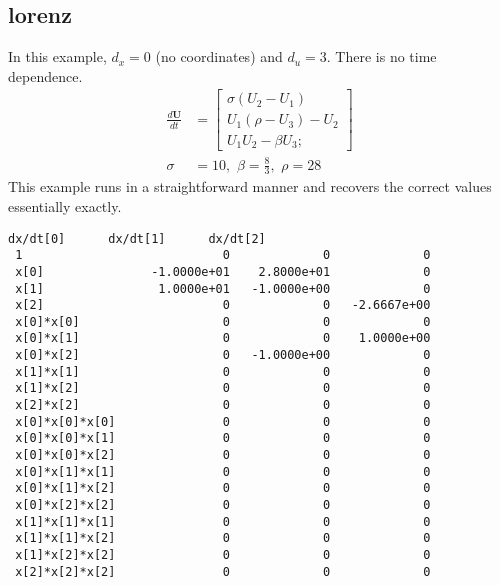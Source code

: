 \documentclass{article}
\let\vec\mathbf
\begin{document}
\subsection{lorenz}
In this example, $d_x = 0$ (no coordinates) and $d_u = 3$. There is no time dependence.
\begin{align*}
\frac{d\vec{U}}{dt} &=
\begin{bmatrix}
\sigma(U_2-U_1) \\
U_1(\rho-U_3)-U_2 \\
U_1U_2-\beta U_3;
\end{bmatrix} \\
\sigma &= 10,\,\, \beta = \frac{8}{3},\,\, \rho = 28
\end{align*}
This example runs in a straightforward manner and recovers the correct values
essentially exactly.
\begin{lstlisting}[language={}]
                      dx/dt[0]      dx/dt[1]      dx/dt[2]
 1                            0             0             0
 x[0]               -1.0000e+01    2.8000e+01             0
 x[1]                1.0000e+01   -1.0000e+00             0
 x[2]                         0             0   -2.6667e+00
 x[0]*x[0]                    0             0             0
 x[0]*x[1]                    0             0    1.0000e+00
 x[0]*x[2]                    0   -1.0000e+00             0
 x[1]*x[1]                    0             0             0
 x[1]*x[2]                    0             0             0
 x[2]*x[2]                    0             0             0
 x[0]*x[0]*x[0]               0             0             0
 x[0]*x[0]*x[1]               0             0             0
 x[0]*x[0]*x[2]               0             0             0
 x[0]*x[1]*x[1]               0             0             0
 x[0]*x[1]*x[2]               0             0             0
 x[0]*x[2]*x[2]               0             0             0
 x[1]*x[1]*x[1]               0             0             0
 x[1]*x[1]*x[2]               0             0             0
 x[1]*x[2]*x[2]               0             0             0
 x[2]*x[2]*x[2]               0             0             0
\end{lstlisting}
\end{document}
